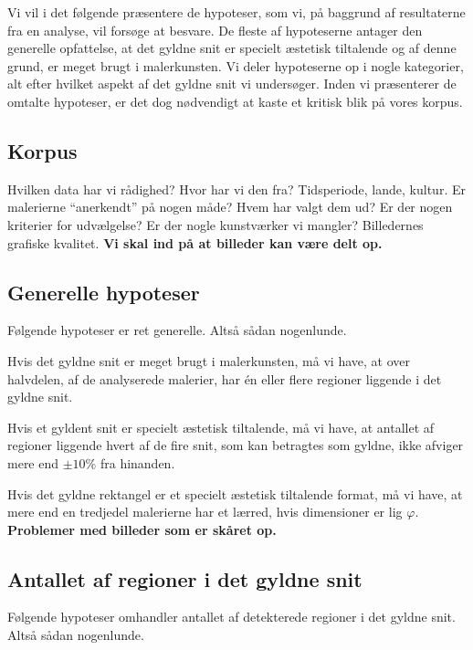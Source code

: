{
{\sffamily Vi vil i det følgende præsentere de hypoteser, som vi, på
baggrund af resultaterne fra en analyse, vil forsøge at besvare. De
fleste af hypoteserne antager den generelle opfattelse, at det gyldne
snit er specielt æstetisk tiltalende og af denne grund, er meget brugt i
malerkunsten. Vi deler hypoteserne op i nogle kategorier, alt efter
hvilket aspekt af det gyldne snit vi undersøger. Inden vi præsenterer de
omtalte hypoteser, er det dog nødvendigt at kaste et kritisk blik på
vores korpus.
}

\subsection{Korpus}
Hvilken data har vi rådighed? Hvor har vi den fra? Tidsperiode, lande,
kultur. Er malerierne ``anerkendt'' på nogen måde? Hvem har valgt dem
ud? Er der nogen kriterier for udvælgelse? Er der nogle kunstværker vi
mangler? Billedernes grafiske kvalitet. \textbf{Vi skal ind på at
billeder kan være delt op.}

\subsection{Generelle hypoteser}
Følgende hypoteser er ret generelle. Altså sådan nogenlunde.

\begin{hypotese}
    Hvis det gyldne snit er meget brugt i malerkunsten, må vi have, at
    over halvdelen, af de analyserede malerier, har én eller flere
    regioner liggende i det gyldne snit.
\end{hypotese}

\begin{hypotese}
    Hvis et gyldent snit er specielt æstetisk tiltalende, må vi have, at
    antallet af regioner liggende hvert af de fire snit, som kan
    betragtes som gyldne, ikke afviger mere end $\pm10\%$ fra hinanden.
\end{hypotese}

\begin{hypotese}
    Hvis det gyldne rektangel er et specielt æstetisk tiltalende format,
    må vi have, at mere end en tredjedel malerierne har et lærred, hvis
    dimensioner er lig $\varphi$. \textbf{Problemer med billeder som er
    skåret op.}
\end{hypotese}

\subsection{Antallet af regioner i det gyldne snit}
Følgende hypoteser omhandler antallet af detekterede regioner i det
gyldne snit. Altså sådan nogenlunde.

}
